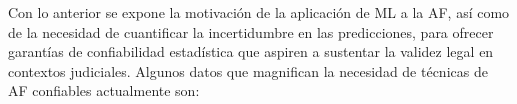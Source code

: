 

Con lo anterior se expone la motivación de la aplicación de \acrshort{ML} a la \acrshort{AF}, así como de la necesidad de cuantificar la incertidumbre en las predicciones, para ofrecer garantías de confiabilidad estadística que aspiren a sustentar la validez legal en contextos judiciales. Algunos datos que magnifican la necesidad de técnicas de \acrshort{AF} confiables actualmente son:

